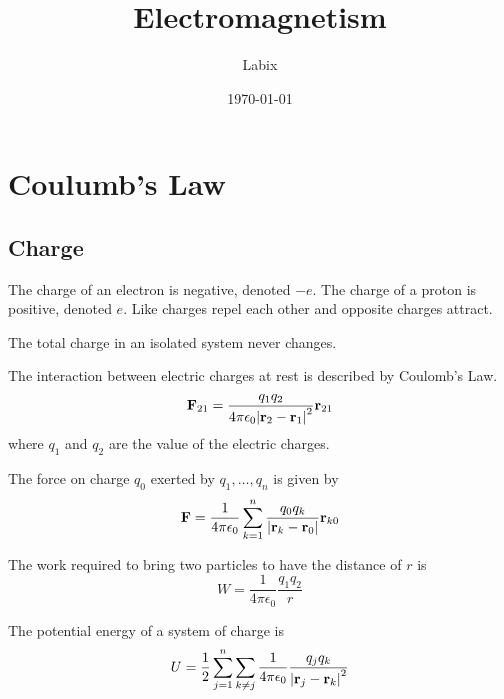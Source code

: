 \documentclass[a4paper]{article}
\title{Electromagnetism}
\author{Labix}
\date{\today}
\begin{document}
\maketitle
\begin{abstract}
\end{abstract}
\pagebreak
\tableofcontents

\pagebreak
\section{Coulumb's Law}
\subsection{Charge}
\begin{defn} The charge of an electron is negative, denoted $-e$. The charge of a proton is positive, denoted $e$. Like charges repel each other and opposite charges attract. 
\end{defn}

\begin{axm} The total charge in an isolated system never changes. 
\end{axm}

\begin{axm}
\end{axm}

\begin{defn} The interaction between electric charges at rest is described by Coulomb's Law. $$\vb{F}_{21}=\frac{q_1q_2}{4\pi\epsilon_0\abs{\vb{r}_2-\vb{r}_1}^2}\vb{r}_{21}$$ where $q_1$ and $q_2$ are the value of the electric charges. 
\end{defn}

\begin{defn} The force on charge $q_0$ exerted by $q_1,\dots,q_n$ is given by $$\vb{F}=\frac{1}{4\pi\epsilon_0}\sum_{k=1}^n\frac{q_0q_k}{\abs{\vb{r}_k-\vb{r}_0}}\vb{r}_{k0}$$
\end{defn}

\begin{thm} The work required to bring two particles to have the distance of $r$ is $$W=\frac{1}{4\pi\epsilon_0}\frac{q_1q_2}{r}$$
\end{thm}

\begin{thm} The potential energy of a system of charge is $$U=\frac{1}{2}\sum_{j=1}^n\sum_{k\neq j}\frac{1}{4\pi\epsilon_0}\frac{q_jq_k}{\abs{\vb{r}_j-\vb{r}_k}^2}$$
\end{thm}
\end{document}
